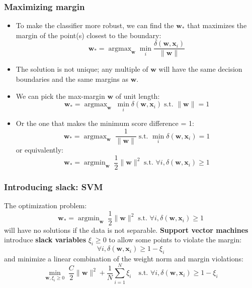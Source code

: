 \documentclass[ignorenonframetext,plain,fleqn]{beamer}
\DeclareMathOperator*{\argmax}{argmax}
\DeclareMathOperator*{\argmin}{argmin}
\renewcommand{\vec}{\mathbf}
\begin{document}
\begin{frame}\frametitle{Maximizing margin}
\begin{itemize}
\item To make the classifier more robust, we can find the $\vec{w}_*$
  that maximizes the margin of the point(s) closest to the boundary: 
\[
  \vec{w}_* = \argmax_\vec{w} \min_i \frac{\delta(\vec{w},\vec{x}_i)}{\|\vec{w}\|} 
\]
\item The solution is not unique; any multiple of $\vec{w}$ will have
  the same decision boundaries and the same margins as $\vec{w}$.
\item We can pick the max-margin $\vec{w}$ of unit length: \[
\vec{w}_* = \argmax_\vec{w}\; \min_i \delta(\vec{w},\vec{x}_i)
\;\text{s.t. } \|\vec{w}\|=1
\]
\item Or the one that makes the minimum score difference = 1: \[
\vec{w}_* = \argmax_\vec{w}\; \frac{1}{\|\vec{w}\|}
\;\text{s.t. } \min_i \delta(\vec{w},\vec{x}_i) = 1
\]
or equivalently: \[
\vec{w}_* = \argmin_\vec{w}\; \frac{1}{2} \|\vec{w}\|^2
\;\text{s.t. } \forall i, \delta(\vec{w},\vec{x}_i) \geq 1
\]
\end{itemize}
\end{frame}

\begin{frame}\frametitle{Introducing slack: SVM}
The optimization problem: 
\[
\vec{w}_* = \argmin_\vec{w}\; \frac{1}{2} \|\vec{w}\|^2
\;\text{s.t. } \forall i, \delta(\vec{w},\vec{x}_i) \geq 1
\]
will have no solutions if the data is not separable.  {\bf Support
  vector machines} introduce {\bf slack variables} $\xi_i \geq 0$ to
allow some points to violate the margin:
\[ 
\forall i, \delta(\vec{w},\vec{x}_i) \geq 1 - \xi_i
\]
and minimize a linear combination of the weight norm and margin
violations:
\[
\min_{\vec{w},\xi_i\geq 0}\; \frac{C}{2} \|\vec{w}\|^2
+ \frac{1}{N} \sum_{i=1}^N \xi_i
\quad\text{s.t. }
\forall i, \delta(\vec{w},\vec{x}_i) \geq 1 - \xi_i
\]
\end{frame}
\end{document}
